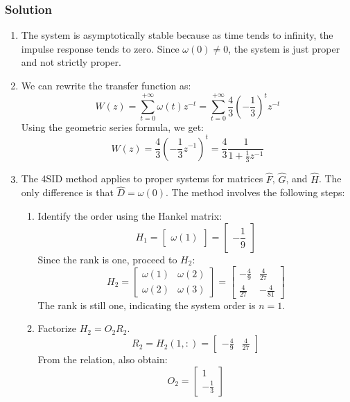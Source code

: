 \subsubsection*{Solution}
\begin{enumerate}
    \item The system is asymptotically stable because as time tends to infinity, the impulse response tends to zero.
        Since $\omega(0)\neq 0$, the system is just proper and not strictly proper.
    \item We can rewrite the transfer function as:
        \[ W(z)=\sum_{t=0}^{+\infty}\omega(t)z^{-t}=\sum_{t=0}^{+\infty}\dfrac{4}{3}\left(-\dfrac{1}{3}\right)^tz^{-t}\]
        Using the geometric series formula, we get:
        \[W(z)=\dfrac{4}{3}\left(-\dfrac{1}{3}z^{-1}\right)^t=\dfrac{4}{3}\dfrac{1}{1+\frac{1}{3}z^{-1}}\]
    \item The 4SID method applies to proper systems for matrices $\hat{F}$, $\hat{G}$, and $\hat{H}$. 
        The only difference is that  $\hat{D}=\omega(0)$.
        The method involves the following steps:
        \begin{enumerate}
            \item Identify the order using the Hankel matrix:
                \[H_1=\begin{bmatrix} \omega(1) \end{bmatrix}=\begin{bmatrix} -\dfrac{1}{9} \end{bmatrix}\]
                Since the rank is one, proceed to $H_2$:
                \[H_2=\begin{bmatrix} \omega(1) & \omega(2) \\ \omega(2) & \omega(3) \end{bmatrix}=\begin{bmatrix} -\frac{4}{9} & \frac{4}{27} \\ \frac{4}{27} & -\frac{4}{81}\end{bmatrix}\]
                The rank is still one, indicating the system order is $n=1$. 
            \item Factorize $H_2=O_2R_2$. 
                \[R_2=H_2(1,:)=\begin{bmatrix} -\frac{4}{9} & \frac{4}{27} \end{bmatrix}\]
                From the relation, also obtain:
                \[O_2=\begin{bmatrix} 1 \\ -\frac{1}{3} \end{bmatrix}\]

\end{enumerate}
\end{enumerate}

